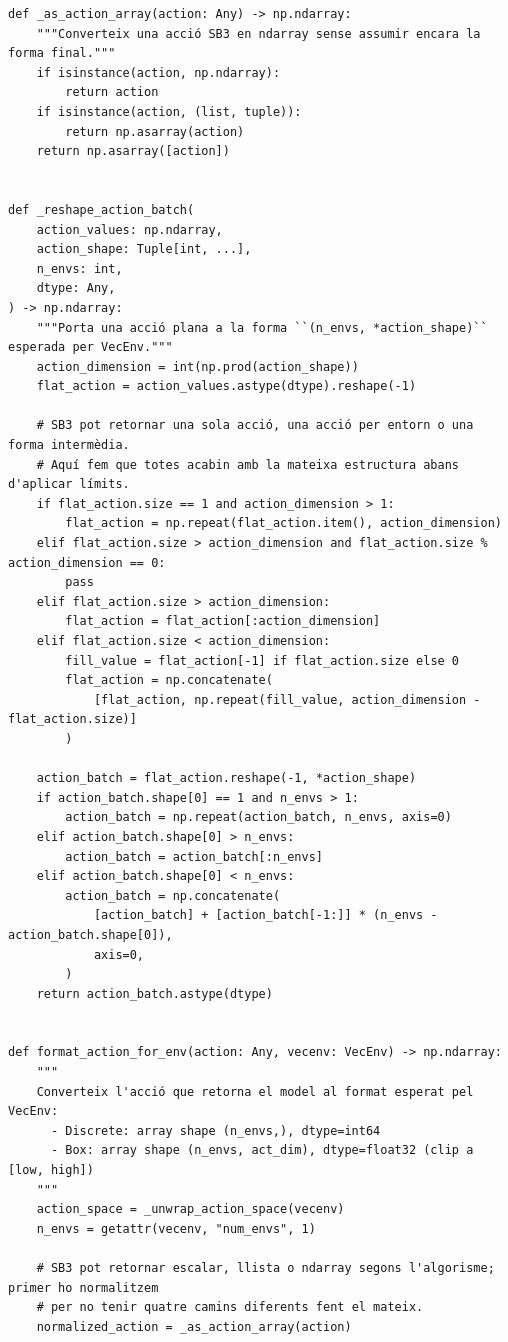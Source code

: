 \documentclass[10pt,a4paper]{article}
\begin{document}
\begin{lstlisting}[style=studioPython,caption={backend/sb3\_utils.py},label={lst:backend-sb3-utils-py}]
def _as_action_array(action: Any) -> np.ndarray:
    """Converteix una acció SB3 en ndarray sense assumir encara la forma final."""
    if isinstance(action, np.ndarray):
        return action
    if isinstance(action, (list, tuple)):
        return np.asarray(action)
    return np.asarray([action])


def _reshape_action_batch(
    action_values: np.ndarray,
    action_shape: Tuple[int, ...],
    n_envs: int,
    dtype: Any,
) -> np.ndarray:
    """Porta una acció plana a la forma ``(n_envs, *action_shape)`` esperada per VecEnv."""
    action_dimension = int(np.prod(action_shape))
    flat_action = action_values.astype(dtype).reshape(-1)

    # SB3 pot retornar una sola acció, una acció per entorn o una forma intermèdia.
    # Aquí fem que totes acabin amb la mateixa estructura abans d'aplicar límits.
    if flat_action.size == 1 and action_dimension > 1:
        flat_action = np.repeat(flat_action.item(), action_dimension)
    elif flat_action.size > action_dimension and flat_action.size % action_dimension == 0:
        pass
    elif flat_action.size > action_dimension:
        flat_action = flat_action[:action_dimension]
    elif flat_action.size < action_dimension:
        fill_value = flat_action[-1] if flat_action.size else 0
        flat_action = np.concatenate(
            [flat_action, np.repeat(fill_value, action_dimension - flat_action.size)]
        )

    action_batch = flat_action.reshape(-1, *action_shape)
    if action_batch.shape[0] == 1 and n_envs > 1:
        action_batch = np.repeat(action_batch, n_envs, axis=0)
    elif action_batch.shape[0] > n_envs:
        action_batch = action_batch[:n_envs]
    elif action_batch.shape[0] < n_envs:
        action_batch = np.concatenate(
            [action_batch] + [action_batch[-1:]] * (n_envs - action_batch.shape[0]),
            axis=0,
        )
    return action_batch.astype(dtype)


def format_action_for_env(action: Any, vecenv: VecEnv) -> np.ndarray:
    """
    Converteix l'acció que retorna el model al format esperat pel VecEnv:
      - Discrete: array shape (n_envs,), dtype=int64
      - Box: array shape (n_envs, act_dim), dtype=float32 (clip a [low, high])
    """
    action_space = _unwrap_action_space(vecenv)
    n_envs = getattr(vecenv, "num_envs", 1)

    # SB3 pot retornar escalar, llista o ndarray segons l'algorisme; primer ho normalitzem
    # per no tenir quatre camins diferents fent el mateix.
    normalized_action = _as_action_array(action)


\end{lstlisting}
\end{document}
